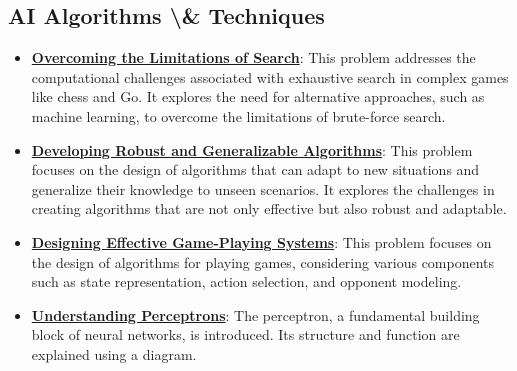 \documentclass{article}%
\begin{document}
\subsection{AI Algorithms \textbackslash{}\& Techniques}%
\label{subsec:AIAlgorithmsTechniques}%
\begin{itemize}[leftmargin=*]%
\item \href{https://purdue.brightspace.com/d2l/common/assets/pdfjs-d2l-dist/1.0.14-legacy/web/viewer.html?file=%2Fcontent%2Fenforced%2F1095467-wl.202510.CS.24300.001%2F02L2-Intro.pdf%3Fou%3D1095467&lang=en-us&container=d2l-fileviewer-rendered-pdf&fullscreen=d2l-fileviewer-rendered-pdf-dialog&height=667#page=11}{\textbf{Overcoming the Limitations of Search}}: This problem addresses the computational challenges associated with exhaustive search in complex games like chess and Go. It explores the need for alternative approaches, such as machine learning, to overcome the limitations of brute-force search.%
\item \href{https://purdue.brightspace.com/d2l/common/assets/pdfjs-d2l-dist/1.0.14-legacy/web/viewer.html?file=%2Fcontent%2Fenforced%2F1095467-wl.202510.CS.24300.001%2F02L2-Intro.pdf%3Fou%3D1095467&lang=en-us&container=d2l-fileviewer-rendered-pdf&fullscreen=d2l-fileviewer-rendered-pdf-dialog&height=667#page=36}{\textbf{Developing Robust and Generalizable Algorithms}}: This problem focuses on the design of algorithms that can adapt to new situations and generalize their knowledge to unseen scenarios. It explores the challenges in creating algorithms that are not only effective but also robust and adaptable.%
\item \href{https://purdue.brightspace.com/d2l/common/assets/pdfjs-d2l-dist/1.0.14-legacy/web/viewer.html?file=%2Fcontent%2Fenforced%2F1095467-wl.202510.CS.24300.001%2F02L2-Intro.pdf%3Fou%3D1095467&lang=en-us&container=d2l-fileviewer-rendered-pdf&fullscreen=d2l-fileviewer-rendered-pdf-dialog&height=667#page=47}{\textbf{Designing Effective Game-Playing Systems}}: This problem focuses on the design of algorithms for playing games, considering various components such as state representation, action selection, and opponent modeling.%
\item \href{https://purdue.brightspace.com/d2l/common/assets/pdfjs-d2l-dist/1.0.14-legacy/web/viewer.html?file=%2Fcontent%2Fenforced%2F1095467-wl.202510.CS.24300.001%2F04L1-Linear Algebra Primer.pdf%3Fou%3D1095467&lang=en-us&container=d2l-fileviewer-rendered-pdf&fullscreen=d2l-fileviewer-rendered-pdf-dialog&height=667#page=17}{\textbf{Understanding Perceptrons}}: The perceptron, a fundamental building block of neural networks, is introduced. Its structure and function are explained using a diagram.%

\end{itemize}
\end{document}
